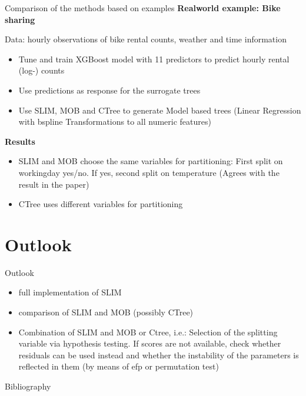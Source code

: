 \documentclass[9pt, xcolor=table]{beamer}
\begin{document}
\begin{frame}{Comparison of the methods based on examples}
\textbf{Realworld example: Bike sharing \citep{Hu.2020}}

Data: hourly observations of bike rental counts, weather and time information
\begin{itemize}
    \item Tune and train XGBoost model with 11 predictors to predict hourly rental (log-) counts
    \item Use predictions as response for the surrogate trees
    \item Use SLIM, MOB and CTree to generate Model based trees (Linear Regression with bspline Transformations to all numeric features)
\end{itemize}

\vspace{0.5cm}
\textbf{Results}
\begin{itemize}
    \item SLIM and MOB choose the same variables for partitioning: First split on workingday yes/no. If yes, second split on temperature (Agrees with the result in the paper)
    \item CTree uses different variables for partitioning
\end{itemize}
\end{frame}


\section{Outlook}

\begin{frame}{Outlook}
\begin{itemize}
    \item full implementation of SLIM
    \item comparison of SLIM and MOB (possibly CTree)
    \item Combination of SLIM and MOB or Ctree, i.e.: Selection of the splitting variable via hypothesis testing. If scores are not available, check whether residuals can be used instead and whether the instability of the parameters is reflected in them (by means of efp or permutation test)
\end{itemize}
    
\end{frame}

    

\begin{frame}{Bibliography}
    
    

\end{frame}
\end{document}
